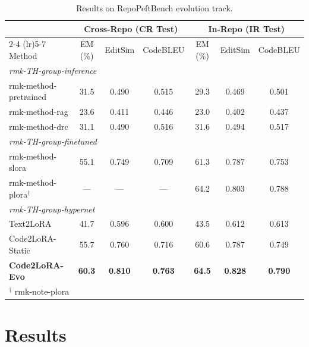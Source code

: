 \documentclass[11pt]{article}
\newcommand{\UseMacro}[1]{\csname rmk-#1\endcsname}
\newcommand{\codelora}{Code2LoRA\xspace}
\newcommand{\repopeftbench}{RepoPeftBench\xspace}
\newcommand{\codelorastatic}{\codelora-Static\xspace}
\newcommand{\codeloraevo}{\codelora-Evo\xspace}
\newcommand{\textlora}{Text2LoRA\xspace}
\begin{document}
\begin{table}[t]
\begin{small}
\begin{center}
\caption{Results on \repopeftbench{} evolution track.}\label{tab:per_commit_results}

\begin{tabular}{l@{\hskip 8pt}ccc@{\hskip 12pt}ccc}
\toprule
& \multicolumn{3}{c}{\textbf{Cross-Repo (CR Test)}} & \multicolumn{3}{c}{\textbf{In-Repo (IR Test)}} \\
\cmidrule(lr){2-4} \cmidrule(lr){5-7}
Method & EM (\%) & EditSim & CodeBLEU & EM (\%) & EditSim & CodeBLEU \\
\midrule
\multicolumn{7}{l}{\emph{\UseMacro{TH-group-inference}}} \\
\midrule
\UseMacro{method-pretrained} & 31.5 & 0.490 & 0.515 & 29.3 & 0.469 & 0.501 \\
\UseMacro{method-rag} & 23.6 & 0.411 & 0.446 & 23.0 & 0.402 & 0.437 \\
\UseMacro{method-drc} & 31.1 & 0.490 & 0.516 & 31.6 & 0.494 & 0.517 \\
\midrule
\multicolumn{7}{l}{\emph{\UseMacro{TH-group-finetuned}}} \\
\midrule
\UseMacro{method-slora} & 55.1 & 0.749 & 0.709 & 61.3 & 0.787 & 0.753 \\
\UseMacro{method-plora}$^\dag$ & --- & --- & --- & 64.2 & 0.803 & 0.788 \\
\midrule
\multicolumn{7}{l}{\emph{\UseMacro{TH-group-hypernet}}} \\
\midrule
\textlora{} & 41.7 & 0.596 & 0.600 & 43.5 & 0.612 & 0.613 \\
\codelorastatic{} & 55.7 & 0.760 & 0.716 & 60.6 & 0.787 & 0.749 \\
\textbf{\codeloraevo{}} & \textbf{60.3} & \textbf{0.810} & \textbf{0.763} & \textbf{64.5} & \textbf{0.828} & \textbf{0.790} \\
\bottomrule
\multicolumn{7}{l}{\footnotesize $^\dag$ \UseMacro{note-plora}} \\
\end{tabular}


\end{center}
\end{small}
\end{table}

\section{Results}
\label{sec:results}
\end{document}
